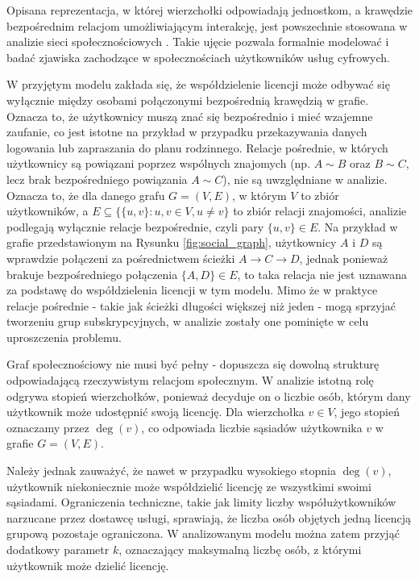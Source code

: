Opisana reprezentacja, w której wierzchołki odpowiadają jednostkom, a krawędzie bezpośrednim relacjom umożliwiającym interakcję, jest powszechnie stosowana w analizie sieci społecznościowych \cite{Brandes2004, NETTLETON20131}. Takie ujęcie pozwala formalnie modelować i badać zjawiska zachodzące w społecznościach użytkowników usług cyfrowych.

W przyjętym modelu zakłada się, że współdzielenie licencji może odbywać się wyłącznie między osobami połączonymi bezpośrednią krawędzią w grafie. Oznacza to, że użytkownicy muszą znać się bezpośrednio i mieć wzajemne zaufanie, co jest istotne na przykład w przypadku przekazywania danych logowania lub zapraszania do planu rodzinnego. Relacje pośrednie, w których użytkownicy są powiązani poprzez wspólnych znajomych (np. \( A \sim B \) oraz \( B \sim C \), lecz brak bezpośredniego powiązania \( A \sim C \)), nie są uwzględniane w analizie. Oznacza to, że dla danego grafu \( G = (V, E) \),
w którym \( V \) to zbiór użytkowników, a \( E \subseteq \{ \{u,v\} : u,v \in V, u \neq v \} \) to zbiór relacji znajomości, analizie podlegają wyłącznie relacje bezpośrednie, czyli pary \( \{u, v\} \in E \).
Na przykład w grafie przedstawionym na Rysunku \ref{fig:social_graph}, użytkownicy \( A \) i \( D \) są wprawdzie połączeni za pośrednictwem ścieżki \( A \rightarrow C \rightarrow D \), jednak ponieważ brakuje bezpośredniego połączenia \( \{A,D\} \in E \), to taka relacja nie jest uznawana za podstawę do współdzielenia licencji w tym modelu.
Mimo że w praktyce relacje pośrednie - takie jak ścieżki długości większej niż jeden - mogą sprzyjać tworzeniu grup subskrypcyjnych, w analizie zostały one pominięte w celu uproszczenia problemu.

Graf społecznościowy nie musi być pełny - dopuszcza się dowolną strukturę odpowiadającą rzeczywistym relacjom społecznym. W analizie istotną rolę odgrywa stopień wierzchołków, ponieważ decyduje on o liczbie osób, którym dany użytkownik może udostępnić swoją licencję. Dla wierzchołka \( v \in V \), jego stopień oznaczamy przez \( \deg(v) \), co odpowiada liczbie sąsiadów użytkownika \( v \) w grafie \( G = (V, E) \).

Należy jednak zauważyć, że nawet w przypadku wysokiego stopnia \( \deg(v) \), użytkownik niekoniecznie może współdzielić licencję ze wszystkimi swoimi sąsiadami. Ograniczenia techniczne, takie jak limity liczby współużytkowników narzucane przez dostawcę usługi, sprawiają, że liczba osób objętych jedną licencją grupową pozostaje ograniczona. W analizowanym modelu można zatem przyjąć dodatkowy parametr \( k \), oznaczający maksymalną liczbę osób, z którymi użytkownik może dzielić licencję.


